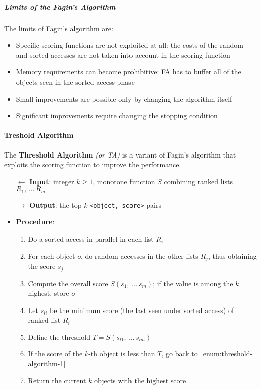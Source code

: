 \documentclass[english]{article}
\begin{document}
\subparagraph*{Limits of the Fagin's Algorithm}
The limits of Fagin's algorithm are:

\begin{itemize}
  \item Specific scoring functions are not exploited at all: the costs of the random and sorted accesses are not taken into account in the scoring function
  \item Memory requirements can become prohibitive: FA has to buffer all of the objects seen in the sorted access phase
  \item Small improvements are possible only by changing the algorithm itself
  \item Significant improvements require changing the stopping condition
\end{itemize}

\paragraph{Treshold Algorithm}

The \textbf{Threshold Algorithm} \textit{(or TA)} is a variant of Fagin's algorithm that exploits the scoring function to improve the performance.

\begin{itemize}
  \item[\(\leftarrow\)] \textbf{Input}: integer \(k \geq 1\), monotone function \(S\) combining ranked lists \(R_1, \,\ldots\, R_m\)
  \item[\(\rightarrow\)] \textbf{Output}: the top \(k\) \texttt{<object, score>} pairs
  \item \textbf{Procedure}:
        \begin{enumerate}[label=step \arabic*., ref=step (\arabic*), widest*=7, leftmargin=*, labelindent=1em]
          \item\label{enum:threshold-algorithm-1} Do a sorted access in parallel in each list \(R_i\)
          \item For each object \(o\), do random accesses in the other lists \(R_j\), thus obtaining the score \(s_j\)
          \item Compute the overall score \(S\left( s_1, \,\ldots\, s_m \right)\); if the value is among the \(k\) highest, store \(o\)
          \item Let \(s_{li}\) be the minimum score (the last seen under sorted access) of ranked list \(R_i\)
          \item Define the threshold \(T = S\left( s_{l1}, \,\ldots\, s_{lm} \right)\)
          \item If the score of the \(k\)-th object is less than \(T\), go back to~\ref{enum:threshold-algorithm-1}
          \item Return the current \(k\) objects with the highest score
        \end{enumerate}
\end{itemize}
\end{document}

